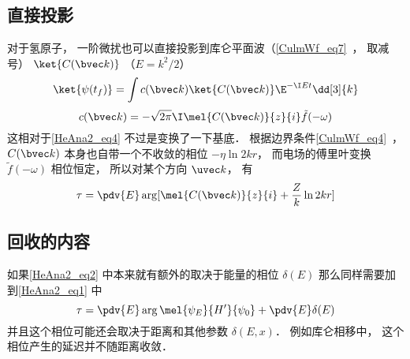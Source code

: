 \subsection{直接投影}
对于氢原子， 一阶微扰也可以直接投影到库仑平面波（\autoref{CulmWf_eq7}~， 取减号） $\ket{C(\bvec k)}$ （$E = k^2/2$）
\begin{equation}
\ket{\psi(t_f)} = \int c(\bvec k)\ket{C(\bvec k)} \E^{-\I E t} \dd[3]{k}
\end{equation}
\begin{equation}
c(\bvec k) = -\sqrt{2\pi}\I\mel{C(\bvec k)}{z}{i} \tilde f(-\omega)
\end{equation}
这相对于\autoref{HeAna2_eq4} 不过是变换了一下基底． 根据边界条件\autoref{CulmWf_eq4}~， $C(\bvec k)$ 本身也自带一个不收敛的相位 $-\eta \ln 2kr$， 而电场的傅里叶变换 $\tilde f(-\omega)$ 相位恒定， 所以对某个方向 $\uvec k$， 有
\begin{equation}
\tau = \pdv{E} \arg[\mel{C(\bvec k)}{z}{i} + \frac{Z}{k}\ln 2kr]
\end{equation}


\subsection{回收的内容}

如果\autoref{HeAna2_eq2} 中本来就有额外的取决于能量的相位 $\delta(E)$ 那么同样需要加到\autoref{HeAna2_eq1} 中
\begin{equation}
\tau = \pdv{E} \arg \mel{\psi_E}{H'}{\psi_0} + \pdv{E} \delta(E)
\end{equation}
并且这个相位可能还会取决于距离和其他参数 $\delta(E, x)$． 例如库仑相移中， 这个相位产生的延迟并不随距离收敛．

